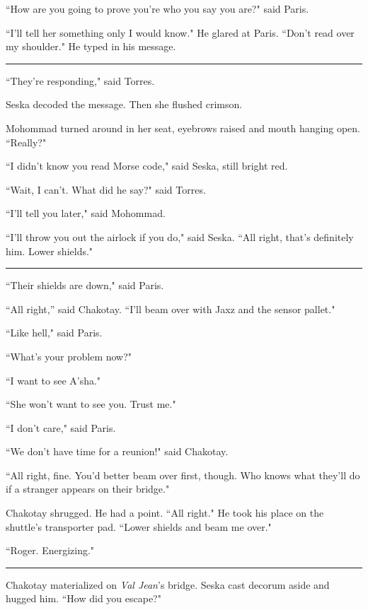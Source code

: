 \documentclass[twoside,letterpaper,12pt]{memoir}
\begin{document}
``How are you going to prove you're who you say you are?" said Paris.

``I'll tell her something only I would know." He glared at Paris. ``Don't read over my shoulder." He typed in his message.

\begin{center}\rule{3cm}{0.4 pt}\end{center}

``They're responding," said Torres.

Seska decoded the message. Then she flushed crimson.

Mohommad turned around in her seat, eyebrows raised and mouth hanging open. ``Really?"

``I didn't know you read Morse code," said Seska, still bright red.

``Wait, I can't. What did he say?" said Torres.

``I'll tell you later," said Mohommad.

``I'll throw you out the airlock if you do," said Seska. ``All right, that’s definitely him. Lower shields."

\begin{center}\rule{3cm}{0.4 pt}\end{center}

``Their shields are down," said Paris.

``All right,” said Chakotay. “I'll beam over with Jaxz and the sensor pallet."

``Like hell," said Paris.

``What's your problem now?"

``I want to see A'sha."

``She won't want to see you. Trust me."

``I don't care," said Paris.

``We don't have time for a reunion!" said Chakotay.

``All right, fine. You'd better beam over first, though. Who knows what they'll do if a stranger appears on their bridge."

Chakotay shrugged. He had a point. ``All right." He took his place on the shuttle's transporter pad. ``Lower shields and beam me over."

``Roger. Energizing."

\begin{center}\rule{3cm}{0.4 pt}\end{center}

Chakotay materialized on \textit{Val Jean}'s bridge. Seska cast decorum aside and hugged him. ``How did you escape?"
\end{document}
